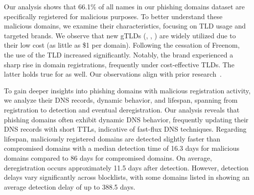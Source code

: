  

Our analysis shows that 66.1\% of all names in our phishing domains dataset are specifically registered for malicious purposes.  
To better understand these malicious domains, we examine their characteristics, focusing on TLD usage and targeted brands. 
We observe that new gTLDs (\eg, , ) are widely utilized due to their low cost (as little as \$1 per domain). 
Following the cessation of Freenom, the use of the  TLD increased significantly. 
Notably, the  brand experienced a sharp rise in domain registrations, frequently under cost-effective TLDs. The latter holds true for  as well.
Our observations align with prior research~\cite{Phishing18:online}.

To gain deeper insights into phishing domains with malicious registration activity, we analyze their DNS records, dynamic behavior, and lifespan, spanning from registration to detection and eventual deregistration. Our analysis reveals that phishing domains often exhibit dynamic DNS behavior, frequently updating their DNS records with short TTLs, indicative of fast-flux DNS techniques. Regarding lifespan, maliciously registered domains are detected slightly faster than compromised domains with a median detection time of 16.3 days for malicious domains compared to 86 days for compromised domains.
On average, deregistration occurs approximately 11.5 days after detection. However, detection delays vary significantly across blocklists, with some domains listed in  showing an average detection delay of up to 388.5 days.

